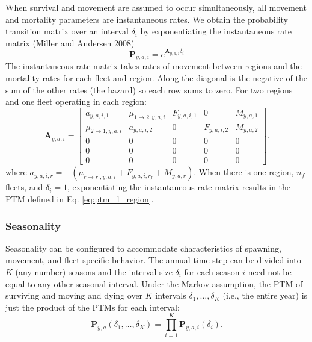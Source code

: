 \documentclass[
]{article}
\begin{document}
When survival and movement are assumed to occur simultaneously, all
movement and mortality parameters are instantaneous rates. We obtain the
probability transition matrix over an interval \(\delta_i\) by
exponentiating the instantaneous rate matrix (Miller and Andersen 2008)
\begin{equation*}
\mathbf{P}_{y,a,i} = e^{\mathbf{A}_{y,a,i}\delta_i}
\end{equation*} The instantaneous rate matrix takes rates of movement
between regions and the mortality rates for each fleet and region. Along
the diagonal is the negative of the sum of the other rates (the hazard)
so each row sums to zero. For two regions and one fleet operating in
each region: \begin{equation*}
 \mathbf{A}_{y,a,i} = \begin{bmatrix}
 a_{y,a,i,1} & \mu_{1\rightarrow 2,y,a,i} & F_{y,a,i,1} & 0 & M_{y,a,1} \\
 \mu_{2\rightarrow 1,y,a,i} &  a_{y,a,i,2} & 0 & F_{y,a,i,2} & M_{y,a,2} \\
 0 & 0 & 0 & 0 & 0 \\
 0 & 0 & 0 & 0 & 0 \\
 0 & 0 & 0 & 0 & 0
 \end{bmatrix}.
\end{equation*} where
\(a_{y,a,i,r} = -(\mu_{r\rightarrow r',y,a,i} + F_{y,a,i,r_f} + M_{y,a,r})\).
When there is one region, \(n_f\) fleets, and \(\delta_i = 1\),
exponentiating the instantaneous rate matrix results in the PTM defined
in Eq. \ref{eq:ptm_1_region}.

\hypertarget{seasonality}{%
\subsubsection*{Seasonality}\label{seasonality}}

Seasonality can be configured to accommodate characteristics of
spawning, movement, and fleet-specific behavior. The annual time step
can be divided into \(K\) (any number) seasons and the interval size
\(\delta_i\) for each season \(i\) need not be equal to any other
seasonal interval. Under the Markov assumption, the PTM of surviving and
moving and dying over \(K\) intervals \(\delta_1,\ldots, \delta_K\)
(i.e., the entire year) is just the product of the PTMs for each
interval:
\[ \mathbf{P}_{y,a}(\delta_1,\ldots,\delta_K) = \prod^K_{i=1}\mathbf{P}_{y,a,i}(\delta_i).\]
\end{document}
